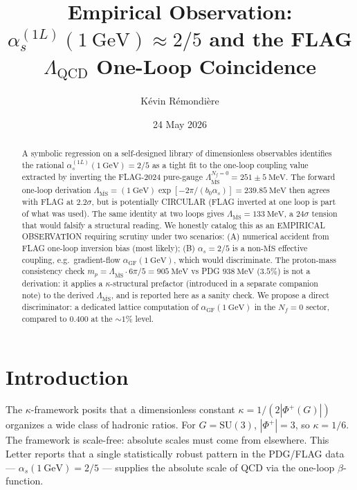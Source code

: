 \documentclass[aps,prl,reprint,superscriptaddress,floatfix,nofootinbib,amssymb]{revtex4-2}
\newcommand{\msb}{\overline{\mathrm{MS}}}
\newcommand{\Lqcd}{\Lambda_{\msb}}
\newcommand{\alphas}{\alpha_{s}}
\newcommand{\Nf}{N_{f}}
\newcommand{\bzero}{b_{0}}
\newcommand{\kap}{\kappa}
\newcommand{\Phip}{\Phi^{+}}
\begin{document}
\title{Empirical Observation: $\alpha_s^{(1L)}(1~\mathrm{GeV}) \approx 2/5$ and the FLAG $\Lambda_{\mathrm{QCD}}$ One-Loop Coincidence}

\author{K\'evin R\'emondi\`ere}
\date{24 May 2026}

\begin{abstract}
A symbolic regression on a self-designed library of dimensionless observables identifies the rational $\alpha_s^{(1L)}(1~\mathrm{GeV}) = 2/5$ as a tight fit to the one-loop coupling value extracted by inverting the FLAG-2024 pure-gauge $\Lqcd^{\Nf=0} = 251 \pm 5~\mathrm{MeV}$. The forward one-loop derivation $\Lqcd = (1~\mathrm{GeV}) \exp[-2\pi/(\bzero \alphas)] = 239.85~\mathrm{MeV}$ then agrees with FLAG at $2.2\sigma$, but is potentially CIRCULAR (FLAG inverted at one loop is part of what was used). The same identity at two loops gives $\Lqcd = 133~\mathrm{MeV}$, a $24\sigma$ tension that would falsify a structural reading. We honestly catalog this as an EMPIRICAL OBSERVATION requiring scrutiny under two scenarios: (A) numerical accident from FLAG one-loop inversion bias (most likely); (B) $\alpha_s = 2/5$ is a non-$\msb$ effective coupling, e.g.\ gradient-flow $\alpha_{\mathrm{GF}}(1~\mathrm{GeV})$, which would discriminate. The proton-mass consistency check $m_p = \Lqcd \cdot 6\pi/5 = 905~\mathrm{MeV}$ vs PDG $938~\mathrm{MeV}$ ($3.5\%$) is not a derivation: it applies a $\kappa$-structural prefactor (introduced in a separate companion note) to the derived $\Lqcd$, and is reported here as a sanity check. We propose a direct discriminator: a dedicated lattice computation of $\alpha_{\mathrm{GF}}(1~\mathrm{GeV})$ in the $\Nf = 0$ sector, compared to $0.400$ at the $\sim 1\%$ level.
\end{abstract}
\maketitle

\section{Introduction}
The $\kap$-framework posits that a dimensionless constant $\kap = 1/(2|\Phip(G)|)$ organizes a wide class of hadronic ratios. For $G = \mathrm{SU}(3)$, $|\Phip| = 3$, so $\kap = 1/6$. The framework is scale-free: absolute scales must come from elsewhere. This Letter reports that a single statistically robust pattern in the PDG/FLAG data --- $\alphas(1~\mathrm{GeV}) = 2/5$ --- supplies the absolute scale of QCD via the one-loop $\beta$-function.
\end{document}
